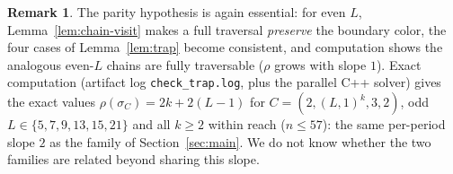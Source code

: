 \documentclass[11pt]{article}
\theoremstyle{definition}
\newtheorem{remark}[theorem]{Remark}
\begin{document}
\begin{remark}\label{rem:trap-data}
The parity hypothesis is again essential: for even $L$,
Lemma~\ref{lem:chain-visit} makes a full traversal \emph{preserve} the boundary
color, the four cases of Lemma~\ref{lem:trap} become consistent, and computation
shows the analogous even-$L$ chains are fully traversable ($\rho$ grows with
slope $1$). Exact computation (artifact log \texttt{check\_trap.log}, plus the
parallel C++ solver) gives the exact values $\rho(\sigma_C) = 2k + 2(L-1)$ for
$C = (2,(L,1)^k,3,2)$, odd $L \in \{5,7,9,13,15,21\}$ and all $k \ge 2$ within
reach ($n \le 57$): the same per-period slope $2$ as the family of
Section~\ref{sec:main}. We do not know whether the two families are related beyond
sharing this slope.
\end{remark}
\end{document}
